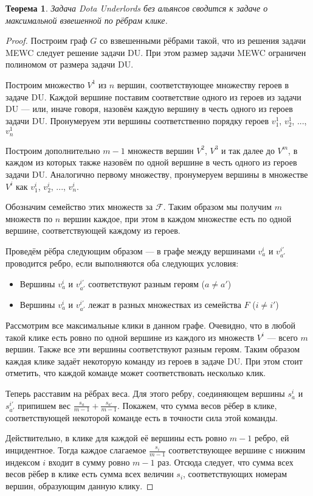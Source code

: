 \documentclass{article}
\newtheorem{theorem}{Теорема}
\begin{document}
\begin{theorem}
\label{trivial_case}
    Задача Dota Underlords без альянсов сводится к задаче о максимальной взвешенной по рёбрам клике.
\end{theorem}
\begin{proof}
    Построим граф $G$ со взвешенными рёбрами такой, что из решения задачи MEWC следует решение задачи DU. При этом размер задачи MEWC ограничен полиномом от размера задачи DU. 
    
    Построим множество $V^1$ из $n$ вершин, соответствующее множеству героев в задаче DU. Каждой вершине поставим соответствие одного из героев из задачи DU --- или, иначе говоря, назовём каждую вершину в честь одного из героев задачи DU. Пронумеруем эти вершины соответственно порядку героев $v_1^1$, $v_2^1$, ..., $v_n^1$
    
    Построим дополнительно $m-1$ множеств вершин $V^2$, $V^3$ и так далее до $V^m$, в каждом из которых также назовём по одной вершине в честь одного из героев задачи DU. Аналогично первому множеству, пронумеруем вершины в множестве $V^i$ как $v_1^i$, $v_2^i$, ..., $v_n^i$.
    
    Обозначим семейство этих множеств за $\mathcal{F}$. Таким образом мы получим $m$ множеств по $n$ вершин каждое, при этом в каждом множестве есть по одной вершине, соответствующей каждому из героев.
    
    Проведём рёбра следующим образом --- в графе между вершинами $v_a^i$ и $v_{a'}^{i'}$ проводится ребро, если выполняются оба следующих условия:
    \begin{itemize}
        \item Вершины $v_a^i$ и $v_{a'}^{i'}$ соответствуют разным героям ($a \neq a'$)
        \item Вершины $v_a^i$ и $v_{a'}^{i'}$ лежат в разных множествах из семейства $F$ ($i \neq i'$)
    \end{itemize}
    
    Рассмотрим все максимальные клики в данном графе. Очевидно, что в любой такой клике есть ровно по одной вершине из каждого из множеств $V^i$ --- всего $m$ вершин. Также все эти вершины соответствуют разным героям. Таким образом каждая клике задаёт некоторую команду из героев в задаче DU. При этом стоит отметить, что каждой команде может соответствовать несколько клик.
    
    Теперь расставим на рёбрах веса. Для этого ребру, соединяющем вершины $s_a^i$ и $s_{a'}^{i'}$ припишем вес $\frac{s_a}{m-1} + \frac{s_{a'}}{m-1}$. Покажем, что сумма весов рёбер в клике, соответствующей некоторой команде есть в точности сила этой команды. 
    
    Действительно, в клике для каждой её вершины есть ровно $m-1$ ребро, ей инцидентное. Тогда каждое слагаемое $\frac{s_i}{m-1}$ соответствующее вершине с нижним индексом $i$ входит в сумму ровно $m-1$ раз. Отсюда следует, что сумма всех весов рёбер в клике есть сумма всех величин $s_i$, соответствующих номерам вершин, образующим данную клику.
\end{proof}
\end{document}
